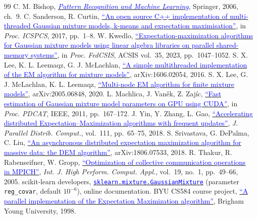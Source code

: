 \documentclass[conference,onecolumn]{IEEEtran}
\begin{document}
\clearpage
\begin{thebibliography}{99}
 C. M. Bishop, \href{https://www.microsoft.com/en-us/research/wp-content/uploads/2006/01/Bishop-Pattern-Recognition-and-Machine-Learning-2006.pdf}{\textcolor{blue}{\emph{Pattern Recognition and Machine Learning}}}, Springer, 2006, ch.~9.
 C. Sanderson, R. Curtin, \href{https://arxiv.org/abs/1707.09094}{\textcolor{blue}{``An open source C++ implementation of multi-threaded Gaussian mixture models, k-means and expectation maximisation''}}, in \emph{Proc. ICSPCS}, 2017, pp.~1--8.
 W. Kwedlo, \href{https://doi.org/10.15439/2023F9859}{\textcolor{blue}{``Expectation-maximization algorithms for Gaussian mixture models using linear algebra libraries on parallel shared-memory systems''}}, in \emph{Proc. FedCSIS}, ACSIS vol.~35, 2023, pp.~1047--1052.
 S. X. Lee, K. L. Leemaqz, G. J. McLachlan, \href{https://arxiv.org/abs/1606.02054}{\textcolor{blue}{``A simple multithreaded implementation of the EM algorithm for mixture models''}}, arXiv:1606.02054, 2016.
 S. X. Lee, G. J. McLachlan, K. L. Leemaqz, \href{https://arxiv.org/abs/2005.06848}{\textcolor{blue}{``Multi-node EM algorithm for finite mixture models''}}, arXiv:2005.06848, 2020.
 L. Machlica, J. Van\v{e}k, Z. Zaj\'{i}c, \href{https://doi.org/10.1109/PDCAT.2011.40}{\textcolor{blue}{``Fast estimation of Gaussian mixture model parameters on GPU using CUDA''}}, in \emph{Proc. PDCAT}, IEEE, 2011, pp.~167--172.
 J. Yin, Y. Zhang, L. Gao, \href{https://doi.org/10.1016/j.jpdc.2017.07.005}{\textcolor{blue}{``Accelerating distributed Expectation--Maximization algorithms with frequent updates''}}, \emph{J. Parallel Distrib. Comput.}, vol.~111, pp.~65--75, 2018.
 S. Srivastava, G. DePalma, C. Liu, \href{https://arxiv.org/abs/1806.07533}{\textcolor{blue}{``An asynchronous distributed expectation maximization algorithm for massive data: the DEM algorithm''}}, arXiv:1806.07533, 2018.
 R. Thakur, R. Rabenseifner, W. Gropp, \href{https://doi.org/10.1177/1094342005051521}{\textcolor{blue}{``Optimization of collective communication operations in MPICH''}}, \emph{Int. J. High Perform. Comput. Appl.}, vol.~19, no.~1, pp.~49--66, 2005.
 scikit-learn developers, \href{https://scikit-learn.org/stable/modules/generated/sklearn.mixture.GaussianMixture.html}{\textcolor{blue}{\texttt{sklearn.mixture.GaussianMixture}}} (parameter \texttt{reg\_covar}, default $10^{-6}$), online documentation.
 BYU CS584 course project, \href{https://faculty.cs.byu.edu/~snell/Classes/CS584/projectsF98/serr/PEMpaper.html}{\textcolor{blue}{``A parallel implementation of the Expectation Maximization algorithm''}}, Brigham Young University, 1998.

\end{thebibliography}
\end{document}
